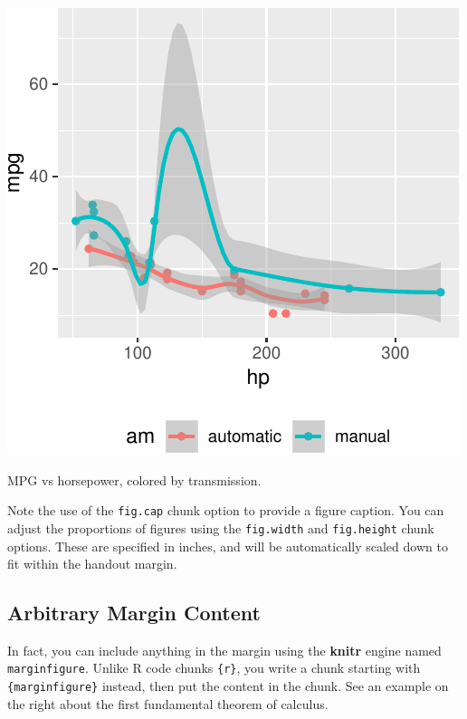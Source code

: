 \documentclass[]{tufte-handout}
\begin{document}
\begin{marginfigure}
\includegraphics{handout-twitter-analysis_files/figure-latex/fig-margin-1} \caption[MPG vs horsepower, colored by transmission]{MPG vs horsepower, colored by transmission.}\label{fig:fig-margin}
\end{marginfigure}

Note the use of the \texttt{fig.cap} chunk option to provide a figure
caption. You can adjust the proportions of figures using the
\texttt{fig.width} and \texttt{fig.height} chunk options. These are
specified in inches, and will be automatically scaled down to fit within
the handout margin.

\subsection{Arbitrary Margin Content}\label{arbitrary-margin-content}

In fact, you can include anything in the margin using the \textbf{knitr}
engine named \texttt{marginfigure}. Unlike R code chunks
\texttt{\textasciigrave{}\textasciigrave{}\textasciigrave{}\{r\}}, you
write a chunk starting with
\texttt{\textasciigrave{}\textasciigrave{}\textasciigrave{}\{marginfigure\}}
instead, then put the content in the chunk. See an example on the right
about the first fundamental theorem of calculus.
\end{document}
